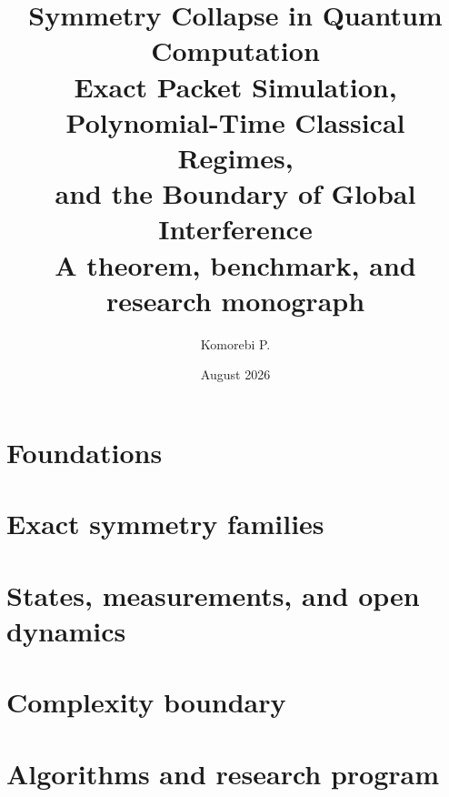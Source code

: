 \documentclass[11pt,openany]{book}
\title{\Huge Symmetry Collapse in Quantum Computation\\[0.45em]
\Large Exact Packet Simulation, Polynomial-Time Classical Regimes,\\
and the Boundary of Global Interference\\[1em]
\large A theorem, benchmark, and research monograph}
\author{Komorebi P.}
\date{August 2026}
\numberwithin{equation}{chapter}
\theoremstyle{definition}
\theoremstyle{remark}
\begin{document}
\frontmatter
\maketitle

\tableofcontents
\listoffigures
\listoftables

\mainmatter
\part{Foundations}







\part{Exact symmetry families}












\part{States, measurements, and open dynamics}





\part{Complexity boundary}





\part{Algorithms and research program}






\appendix






\backmatter

\printindex
\end{document}
